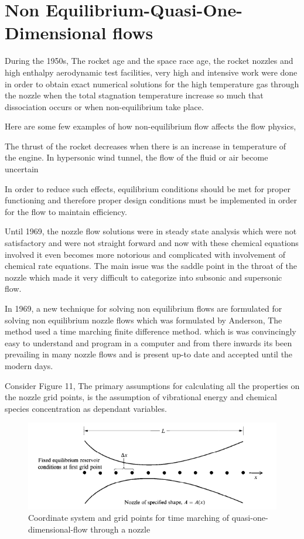 \section{Non Equilibrium-Quasi-One-Dimensional flows} 
\label{sec:method}

During the 1950s, The rocket age and the space race age, the rocket nozzles and high enthalpy aerodynamic test facilities, very high and intensive work were done in order to obtain exact numerical solutions for the high temperature gas through the nozzle when the total stagnation temperature increase so much that dissociation occurs or when non-equilibrium take place.

Here are some few examples of how non-equilibrium flow affects the flow physics,

The thrust of the rocket decreases when there is an increase in  temperature of the engine. In hypersonic wind tunnel, the flow of the fluid or air become uncertain

In order to reduce such effects, equilibrium conditions should be met for proper functioning and therefore proper design conditions must be implemented in order for the flow to maintain efficiency.

Until 1969, the nozzle flow solutions were in steady state analysis which were not satisfactory and were not straight forward and now with these chemical equations involved it even becomes more notorious and complicated with involvement of chemical rate equations. The main issue was the saddle point in the throat of the nozzle which made it very difficult to categorize into subsonic and supersonic flow. 

In 1969, a new technique for solving non equilibrium flows are formulated for solving non equilibrium nozzle flows which was formulated by Anderson, The method used a time marching finite difference method. which is was convincingly easy to understand and program in a computer and from there inwards its been prevailing in many nozzle flows and is present up-to date and accepted until the modern days.

Consider Figure 11, The primary assumptions for calculating all the properties on the nozzle grid points, is the assumption of vibrational energy and chemical species concentration as dependant variables.

\begin{figure}[ht]
\centering
  \includegraphics[width=0.7\linewidth]{images/nozzle_timemarching.png}
  \caption{Coordinate system and grid points for time marching of quasi-one-dimensional-flow through a nozzle }
  \label{fig:boat1}
\end{figure}

